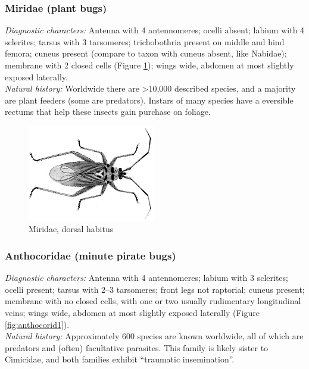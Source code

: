 \documentclass[letterpaper, 11pt]{article}
\begin{document}
\subsubsection{Miridae (plant bugs)}
\noindent{}\textit{Diagnostic characters:} Antenna with 4 antennomeres; ocelli absent; labium with 4 sclerites; tarsus with 3 tarsomeres; trichobothria present on middle and hind femora; cuneus present (compare to taxon with cuneus absent, like Nabidae); membrane with 2 closed cells (Figure \ref{fig:mirid}); wings wide, abdomen at most slightly exposed laterally.\\

\noindent{}\textit{Natural history:} Worldwide there are \textgreater10,000 described species, and a majority are plant feeders (some are predators). Instars of many species have a eversible rectums that help these insects gain purchase on foliage.\\

\begin{figure}[ht!]
 \centering
 \includegraphics[width=0.5\textwidth]{MiridHabitus.png}
 \caption{Miridae, dorsal habitus \citep[][Plate II, Fig. 1]{bhl132930}}
 \label{fig:mirid}
\end{figure}

\subsubsection{Anthocoridae (minute pirate bugs)}
\noindent{}\textit{Diagnostic characters:} Antenna with 4 antennomeres; labium with 3 sclerites; ocelli present; tarsus with 2--3 tarsomeres; front legs not raptorial; cuneus present; membrane with no closed cells, with one or two usually rudimentary longitudinal veins; wings wide, abdomen at most slightly exposed laterally (Figure \ref{fig:anthocorid1}).\\

\noindent{}\textit{Natural history:} Approximately 600 species are known worldwide, all of which are predators and (often) facultative parasites. This family is likely sister to Cimicidae, and both families exhibit ``traumatic insemination''.\\
\end{document}
